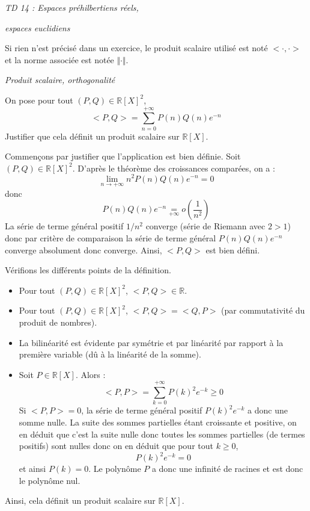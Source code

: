 \documentclass[a4paper,10pt]{report}
\begin{document}
\everymath{\displaystyle}


\begin{center}
\textit{{ {\huge TD 14 : Espaces préhilbertiens réels, }}}

\textit{{ {\huge espaces euclidiens}}}
\end{center}

\bigskip

\noindent Si rien n'est précisé dans un exercice, le produit scalaire utilisé est noté $< \cdot , \cdot >$ et la norme associée est notée $\Vert \cdot \Vert$.


\medskip

\begin{center}
\textit{{ {\large Produit scalaire, orthogonalité}}}
\end{center}

\medskip

\begin{Exercice}{} On pose pour tout $(P,Q) \in \mathbb{R}[X]^2$,
$$ <P,Q> = \sum_{n=0}^{+ \infty} P(n) Q(n) e^{-n} $$
Justifier que cela définit un produit scalaire sur $\mathbb{R}[X]$.
\end{Exercice}

\corr Commençons par justifier que l'application est bien définie. Soit $(P,Q) \in \mathbb{R}[X]^2$. D'après le théorème des croissances comparées, on a :
$$ \lim_{n \rightarrow + \infty} n^2 P(n)Q(n) e^{-n} = 0$$
donc
$$ P(n)Q(n) e^{-n} \underset{+ \infty}{=} o \left( \dfrac{1}{n^2} \right)$$
La série de terme général positif $1/n^2$ converge (série de Riemann avec $2>1$) donc par critère de comparaison la série de terme général $P(n)Q(n) e^{-n}$ converge absolument donc converge. Ainsi, $<P,Q>$ est bien défini.

\medskip

\noindent Vérifions les différents points de la définition.

\begin{itemize}
\item Pour tout $(P,Q) \in \mathbb{R}[X]^2$, $<P,Q> \in \mathbb{R}$.
\item Pour tout $(P,Q) \in \mathbb{R}[X]^2$, $<P,Q>= <Q,P>$ (par commutativité du produit de nombres).
\item La bilinéarité est évidente par symétrie et par linéarité par rapport à la première variable (dû à la linéarité de la somme).
\item Soit $P \in \mathbb{R}[X]$. Alors :
$$ <P,P> = \sum_{k=0}^{+\infty} P(k)^2 e^{-k} \geq 0$$
Si $<P,P>=0$, la série de terme général positif $P(k)^2 e^{-k}$ a donc une somme nulle. La suite des sommes partielles étant croissante et positive, on en déduit que c'est la suite nulle donc toutes les sommes partielles (de termes positifs) sont nulles donc on en déduit que pour tout $k \geq 0$,
$$ P(k)^2 e^{-k} = 0$$
et ainsi $P(k)=0$. Le polynôme $P$ a donc une infinité de racines et est donc le polynôme nul.
\end{itemize}
Ainsi, cela définit un produit scalaire sur $\mathbb{R}[X]$.
\end{document}
